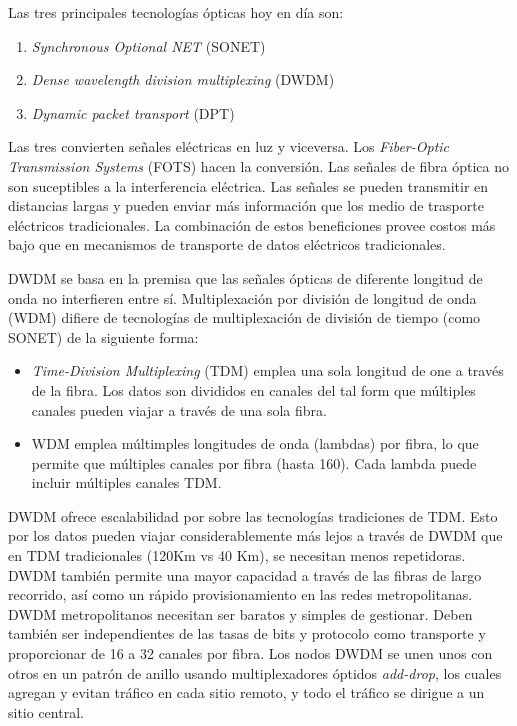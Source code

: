 \documentclass[10pt,journal,compsoc]{IEEEtran}
\begin{document}
Las tres principales tecnologías ópticas hoy en día son:
\begin{enumerate}
    \item \emph{Synchronous Optional NET} (SONET)
    \item \emph{Dense wavelength division multiplexing} (DWDM)
    \item \emph{Dynamic packet transport} (DPT)
\end{enumerate}

Las tres convierten señales eléctricas en luz y viceversa. Los \emph{Fiber-Optic Transmission Systems} (FOTS) hacen la conversión. Las señales de fibra óptica no son suceptibles a la interferencia eléctrica. Las señales se pueden transmitir en distancias largas y pueden enviar más información que los medio de trasporte eléctricos tradicionales. La combinación de estos beneficiones provee costos más bajo que en mecanismos de transporte de datos eléctricos tradicionales.

DWDM se basa en la premisa que las señales ópticas de diferente longitud de onda no interfieren entre sí. Multiplexación por división de longitud de onda (WDM) difiere de tecnologías de multiplexación de división de tiempo (como SONET) de la siguiente forma:
\begin{itemize}
    \item \emph{Time-Division Multiplexing} (TDM) emplea una sola longitud de one a través de la fibra. Los datos son divididos en canales del tal form que múltiples canales pueden viajar a través de una sola fibra.
    \item WDM emplea múltimples longitudes de onda (lambdas) por fibra, lo que permite que múltiples canales por fibra (hasta 160). Cada lambda puede incluir múltiples canales TDM.
\end{itemize}

DWDM ofrece escalabilidad por sobre las tecnologías tradiciones de TDM. Esto por los datos pueden viajar considerablemente más lejos a través de DWDM que en TDM tradicionales (120Km vs 40 Km), se necesitan menos repetidoras. DWDM también permite una mayor capacidad a través de las fibras de largo recorrido, así como un rápido provisionamiento en las redes metropolitanas. DWDM metropolitanos necesitan ser baratos y simples de gestionar. Deben también ser independientes de las tasas de bits y protocolo como transporte y proporcionar de 16 a 32 canales por fibra. Los nodos DWDM se unen unos con otros en un patrón de anillo usando multiplexadores óptidos \emph{add-drop}, los cuales agregan y evitan tráfico en cada sitio remoto, y todo el tráfico se dirigue a un sitio central.
\end{document}
